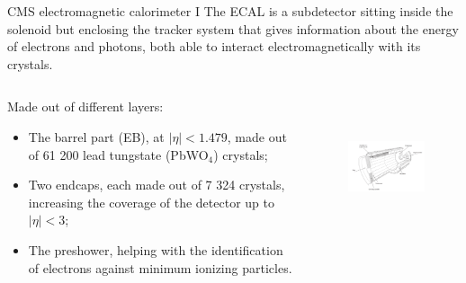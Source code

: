 \documentclass[8pt]{beamer}
\begin{document}
\begin{frame}{CMS electromagnetic calorimeter I}
\justifying
\vspace{5pt}
The ECAL is a subdetector sitting inside the solenoid but enclosing the tracker
system that gives information about the energy of electrons and photons, both able to interact
electromagnetically with its crystals. \vfill

\begin{columns}
	\begin{column}{0.45 \textwidth}
	Made out of different layers:
	\begin{itemize}
	\justifying
	\item The barrel part (EB), at $|\eta| < 1.479$, made out of 61 200 lead tungstate (PbWO$_4$) crystals;
	\item Two endcaps, each made out of 7 324 crystals, increasing the coverage of the detector up to $|\eta| < 3$;
	\item The preshower, helping with the identification of electrons
against minimum ionizing particles.
	\end{itemize}
	\end{column}
	\begin{column}{0.55 \textwidth}
	\begin{figure}[htbp]
\begin{center}
\includegraphics[width=6.6cm, height=4cm]{figs/CMSEcal.png}
\end{center}
\end{figure}
	\end{column}
\end{columns} \vfill

\end{frame}
\end{document}

